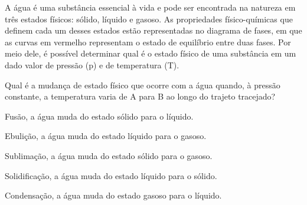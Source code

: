 A água é uma substância essencial à vida e pode ser encontrada na natureza em três estados físicos: sólido, líquido e gasoso. As propriedades físico-químicas que definem cada um desses estados estão representadas no diagrama de fases, em que as curvas em vermelho representam o estado de equilíbrio entre duas fases. Por meio dele, é possível determinar qual é o estado físico de uma substância em um dado valor de pressão (p) e de temperatura (T).\par
{}
Qual é a mudança de estado físico que ocorre com a água quando, à pressão constante, a temperatura varia de A para B ao longo do trajeto tracejado?\par
\begin{alternativas}
  \item Fusão, a água muda do estado sólido para o líquido.
  \item Ebulição, a água muda do estado líquido para o gasoso.
  \item Sublimação, a água muda do estado sólido para o gasoso.
  \item Solidificação, a água muda do estado líquido para o sólido.
  \item Condensação, a água muda do estado gasoso para o líquido.
\end{alternativas}
